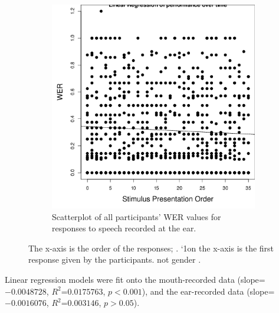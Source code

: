 \begin{figure}[ht]
\begin{subfigure}{0.47\textwidth}
\includegraphics[width=\maxwidth]{figure/line_graph_chrono-1} 

\caption{Scatterplot of all participants' WER values for responses to speech recorded at the ear.}
\label{fig:linear_performance_e}
\end{subfigure}
\caption{\DIFaddbeginFL {}\DIFaddendFL The x-axis is the order of the responses; \DIFdelbeginFL {}\DIFdelendFL \DIFaddbeginFL {}\DIFaddendFL . `1\DIFaddbeginFL {}\DIFaddendFL on the x-axis is the first response given by the participants.  \DIFdelbeginFL {}\DIFdelendFL \DIFaddbeginFL {}\DIFaddendFL not \DIFdelbeginFL {}\DIFdelendFL \DIFaddbeginFL {}\DIFaddendFL gender \DIFdelbeginFL {}\DIFdelendFL \DIFaddbeginFL {}\DIFaddendFL .}
\end{figure}
%
Linear regression models were fit onto the mouth-recorded data (slope=$-0.0048728$, $R^2$=$0.0175763$, $p<0.001$), and the ear-recorded data (slope=$-0.0016076$, $R^2$=$0.003146$, $p>0.05$). 

